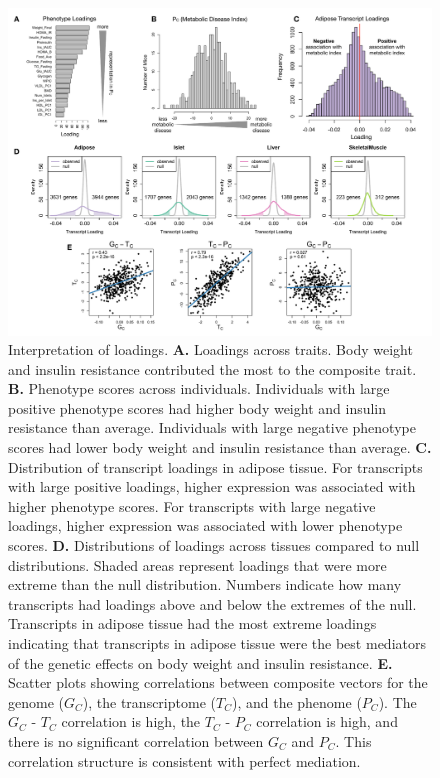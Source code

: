 \documentclass[
]{article}
\begin{document}
\begin{figure}[ht!]
\includegraphics[width=\textwidth]{Figures/Fig4_interpretation.pdf} 
\caption{Interpretation of loadings. \textbf{A.} Loadings across traits. 
Body weight and insulin resistance contributed the most to the composite 
trait. \textbf{B.} Phenotype scores across individuals. Individuals with large 
positive phenotype scores had higher body weight and insulin resistance 
than average. Individuals with large negative phenotype scores had lower 
body weight and insulin resistance than average. \textbf{C.} Distribution of 
transcript loadings in adipose tissue. For transcripts with large positive 
loadings, higher expression was associated with higher phenotype scores. 
For transcripts with large negative loadings, higher expression was associated 
with lower phenotype scores. \textbf{D.} Distributions of loadings across 
tissues compared to null distributions. Shaded areas represent loadings that 
were more extreme than the null distribution. Numbers indicate how many 
transcripts had loadings above and below the extremes of the null. Transcripts 
in adipose tissue had the most extreme loadings indicating that transcripts in 
adipose tissue were the best mediators of the genetic effects on body weight 
and insulin resistance. \textbf{E.} Scatter plots showing correlations between 
composite vectors for the genome ($G_C$), the transcriptome ($T_C$), and the 
phenome ($P_C$). The $G_C$ - $T_C$ correlation is high, the $T_C$ - $P_C$ 
correlation is high, and there is no significant correlation between $G_C$ 
and $P_C$. This correlation structure is consistent with perfect mediation.
}
\label{fig:interpretation}
\end{figure}
\end{document}

